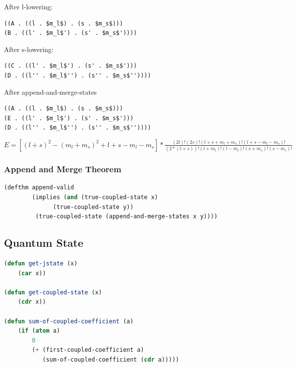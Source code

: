\documentclass[
paper=128mm:96mm, %
fontsize=11pt, %
pagesize, %
parskip=half-, %
]{scrartcl} %
\theoremstyle{mythmstyle} %
\begin{document}
After l-lowering: 

\begin{lstlisting}[language=Lisp,breaklines=true,mathescape]
((A . ((l . $m_l$) . (s . $m_s$))) 
(B . ((l' . $m_l$') . (s' . $m_s$'))))
\end{lstlisting}

After s-lowering:

\begin{lstlisting}[language=Lisp,breaklines=true,mathescape]
((C . ((l' . $m_l$') . (s' . $m_s$'))) 
(D . ((l'' . $m_l$'') . (s'' . $m_s$''))))
\end{lstlisting}

\clearpage

After append-and-merge-states

\begin{lstlisting}[language=Lisp,breaklines=true,mathescape]
((A . ((l . $m_l$) . (s . $m_s$)))
(E . ((l' . $m_l$') . (s' . $m_s$'))) 
(D . ((l'' . $m_l$'') . (s'' . $m_s$''))))
\end{lstlisting}

$E= [(l+s)^2 - (m_l+m_s)^2 + l+s -m_l -m_s]* \frac{(2l)!(2s)!(l+s+m_l+m_s)!(l+s-m_l- m_s)!}{(2*(l+s))! (l+m_l)!(l-m_l)!(s+m_s)!(s-m_s)!}$\cite{Clebsch}

\clearpage

\subsubsection{Append and Merge Theorem}

\begin{lstlisting}[language=Lisp,breaklines=true]
(defthm append-valid
        (implies (and (true-coupled-state x)
		      (true-coupled-state y))
	     (true-coupled-state (append-and-merge-states x y))))
\end{lstlisting}

\clearpage

\subsection{Quantum State}

\begin{lstlisting}[language=Lisp,breaklines=true]
(defun get-jstate (x)
	(car x))

(defun get-coupled-state (x)
	(cdr x))

(defun sum-of-coupled-coefficient (a)
	(if (atom a)
	    0
	    (+ (first-coupled-coefficient a)
	       (sum-of-coupled-coefficient (cdr a)))))
\end{lstlisting}
\end{document}

